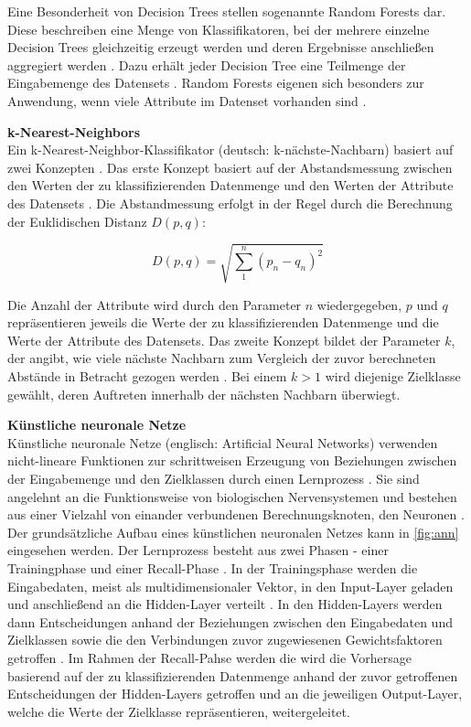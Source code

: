 Eine Besonderheit von Decision Trees stellen sogenannte Random Forests dar. Diese beschreiben eine Menge von Klassifikatoren, bei der mehrere einzelne Decision Trees gleichzeitig erzeugt werden und deren Ergebnisse anschließen aggregiert werden \cite{Alam2013}. Dazu erhält jeder Decision Tree eine Teilmenge der Eingabemenge des Datensets \cite{Alam2013}. Random Forests eigenen sich besonders zur Anwendung, wenn viele Attribute im Datenset vorhanden sind \cite{Alam2013}.

\textbf{k-Nearest-Neighbors\medskip}\\
Ein k-Nearest-Neighbor-Klassifikator (deutsch: k-nächste-Nachbarn) basiert auf zwei Konzepten \cite{Zhang2016}. Das erste Konzept basiert auf der Abstandsmessung zwischen den Werten der zu klassifizierenden Datenmenge und den Werten der Attribute des Datensets \cite{Zhang2016}. Die Abstandmessung erfolgt in der Regel durch die Berechnung der Euklidischen Distanz $D(p,q)$:

\[D(p,q)=\sqrt{\sum_1^n(p_{n}-q_{n})^{2}}\] 

Die Anzahl der Attribute wird durch den Parameter $n$ wiedergegeben, $p$ und $q$ repräsentieren jeweils die Werte der zu klassifizierenden Datenmenge und die Werte der Attribute des Datensets. Das zweite Konzept bildet der Parameter $k$, der angibt, wie viele nächste Nachbarn zum Vergleich der zuvor berechneten Abstände in Betracht gezogen werden \cite{Zhang2016}. Bei einem $k > 1$ wird diejenige Zielklasse gewählt, deren Auftreten innerhalb der nächsten Nachbarn überwiegt.

\textbf{Künstliche neuronale Netze\medskip}\\
Künstliche neuronale Netze (englisch: Artificial Neural Networks) verwenden nicht-lineare Funktionen zur schrittweisen Erzeugung von Beziehungen zwischen der Eingabemenge und den Zielklassen durch einen Lernprozess \cite{Linder2004}. Sie sind angelehnt an die Funktionsweise von biologischen Nervensystemen und bestehen aus einer Vielzahl von einander verbundenen Berechnungsknoten, den Neuronen \cite{OShea2015}. Der grundsätzliche Aufbau eines künstlichen neuronalen Netzes kann in \autoref{fig:ann} eingesehen werden. Der Lernprozess besteht aus zwei Phasen - einer Trainingphase und einer Recall-Phase \cite{Linder2004}. In der Trainingsphase werden die Eingabedaten, meist als multidimensionaler Vektor, in den Input-Layer geladen und anschließend an die Hidden-Layer verteilt \cite{OShea2015}. In den Hidden-Layers werden dann Entscheidungen anhand der Beziehungen zwischen den Eingabedaten und Zielklassen sowie die den Verbindungen zuvor zugewiesenen Gewichtsfaktoren getroffen \cite{Linder2004,OShea2015}. Im Rahmen der Recall-Pahse werden die wird die Vorhersage basierend auf der zu klassifizierenden Datenmenge anhand der zuvor getroffenen Entscheidungen der Hidden-Layers getroffen und an die jeweiligen Output-Layer, welche die Werte der Zielklasse repräsentieren, weitergeleitet\cite{Linder2004}. 

